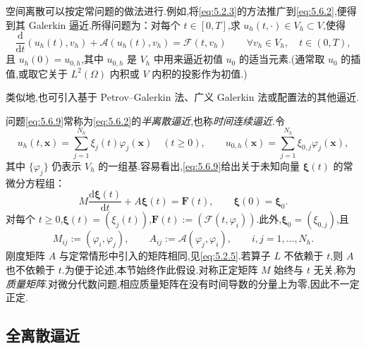 空间离散可以按定常问题的做法进行.例如,将\eqref{eq:5.2.3}的方法推广到\eqref{eq:5.6.2},便得到其 Galerkin 逼近.所得问题为：对每个 \(t\in[0,T]\),求 \(u_h(t,\cdot)\in V_h\subset V\),使得
\begin{equation}\label{eq:5.6.9}
  \frac{\mathrm d}{\mathrm dt}(u_h(t),v_h)+\mathcal A(u_h(t),v_h)
  =\mathcal F(t,v_h)\qquad\forall v_h\in V_h,\quad t\in(0,T),
\end{equation}
且 \(u_h(0)=u_{0,h}\),其中 \(u_{0,h}\) 是 \(V_h\) 中用来逼近初值 \(u_0\) 的适当元素.(通常取 \(u_0\) 的插值,或取它关于 \(L^2(\Omega)\) 内积或 \(V\) 内积的投影作为初值.)

类似地,也可引入基于 Petrov--Galerkin 法、广义 Galerkin 法或配置法的其他逼近.

问题\eqref{eq:5.6.9}常称为\eqref{eq:5.6.2}的\emph{半离散逼近},也称\emph{时间连续逼近}.令
\begin{equation}\label{eq:5.6.10}
  u_h(t,\boldsymbol{x})=\sum_{j=1}^{N_h}\xi_j(t)\varphi_j(\boldsymbol{x})\quad(t\ge0),
  \qquad
  u_{0,h}(\boldsymbol{x})=\sum_{j=1}^{N_h}\xi_{0,j}\varphi_j(\boldsymbol{x}),
\end{equation}
其中 \(\{\varphi_j\}\) 仍表示 \(V_h\) 的一组基.容易看出,\eqref{eq:5.6.9}给出关于未知向量 \(\boldsymbol{\xi}(t)\) 的常微分方程组：
\begin{equation}\label{eq:5.6.11}
  M\frac{\mathrm d\boldsymbol{\xi}(t)}{\mathrm dt}+A\boldsymbol{\xi}(t)
    =\boldsymbol{F}(t),\qquad \boldsymbol{\xi}(0)=\boldsymbol{\xi}_0.
\end{equation}
对每个 \(t\ge0\),\(\boldsymbol{\xi}(t)=(\xi_j(t))\),\(\boldsymbol{F}(t):=(\mathcal F(t,\varphi_i))\).此外,\(\boldsymbol{\xi}_0=(\xi_{0,j})\),且
\begin{equation}\label{eq:5.6.12}
  M_{ij}:=(\varphi_i,\varphi_j),\qquad
  A_{ij}:=\mathcal A(\varphi_j,\varphi_i),\qquad i,j=1,\ldots,N_h.
\end{equation}
刚度矩阵 \(A\) 与定常情形中引入的矩阵相同,见\eqref{eq:5.2.5}.若算子 \(L\) 不依赖于 \(t\),则 \(A\) 也不依赖于 \(t\).为便于论述,本节始终作此假设.对称正定矩阵 \(M\) 始终与 \(t\) 无关,称为\emph{质量矩阵}.对微分代数问题,相应质量矩阵在没有时间导数的分量上为零,因此不一定正定.

\subsection{全离散逼近}\label{sec:5.6.2}

